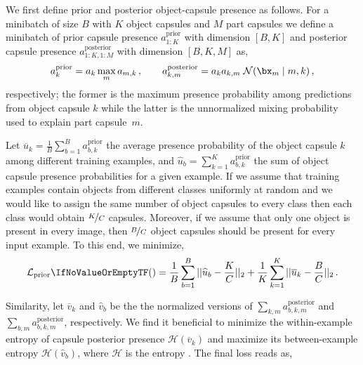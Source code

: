We first define prior and posterior object-capsule presence as follows.
For a minibatch of size {\small$B$} with {\small$K$} object capsules and $M$ part capsules we define a minibatch of prior capsule presence $a^\mathrm{prior}_{1:K}$ with dimension {\small$[B, K]$} and posterior capsule presence $a^\mathrm{posterior}_{1:K,1:M}$ with dimension {\small$[B, K, M]$} as,
\begin{equation}
    a^\mathrm{prior}_k = a_k \max_m a_{m,k}\,,
    \qquad
    a^\mathrm{posterior}_{k,m} = a_k a_{k,m}\;\gauss{\bx_m \mid m,k}\,,
\end{equation}
respectively; the former is the maximum presence probability among predictions from object capsule $k$ while the latter is the unnormalized mixing probability used to explain part capsule~$m$.
\begin{description}[leftmargin=\parindent]
\item[Prior sparsity]
    Let $\overline{u}_k = \frac{1}{B} \sum_{b=1}^B a^\mathrm{prior}_{b,k}$ the average presence probability of the object capsule $k$ among different training examples, and $\widehat{u}_b = \sum_{k=1}^K a^\mathrm{prior}_{b,k}$ the sum of object capsule presence probabilities for a given example.
    If we assume that training examples contain objects from different classes uniformly at random and we would like to assign the same number of object capsules to every class then each class would obtain $\nicefrac{K}{C}$ capsules.
    Moreover, if we assume that only one object is present in every image, then $\nicefrac{B}{C}$ object capsules should be present for every input example.
    To this end, we minimize,
    \begin{equation}
        \loss[\mathrm{prior}]{} = 
        \frac{1}{B} \sum_{b=1}^B ||\widehat{u}_b  - \frac{K}{C} ||_2
        +
         \frac{1}{K} \sum_{k=1}^K || \overline{u}_k  - \frac{B}{C} ||_2\,. \label{eq:prior_sparsity}
    \end{equation}
\item[Posterior Sparsity]
    Similarity, let $\overline{v}_k$ and $\widehat{v}_b$ be the the normalized versions of  $\sum_{k,m} a^\mathrm{posterior}_{b,k,m}$
    and $\sum_{b,m} a^\mathrm{posterior}_{b,k,m}$, respectively.
    We find it beneficial to minimize the within-example entropy of capsule posterior presence $\mathcal{H}(\overline{v}_k)$ and maximize its between-example entropy $\mathcal{H}(\widehat{v}_b)$, where $\mathcal{H}$ is the entropy . The final loss reads as,
    \begin{equation}

\end{equation}
\end{description}
